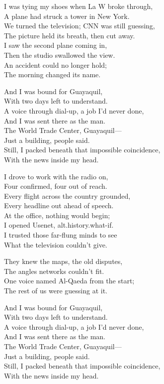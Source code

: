 \begin{lyrics}
I was tying my shoes when La W broke through,\\
A plane had struck a tower in New York.\\
We turned the television; CNN was still guessing,\\
The picture held its breath, then cut away.\\
I saw the second plane coming in,\\
Then the studio swallowed the view.\\
An accident could no longer hold;\\
The morning changed its name.

And I was bound for Guayaquil,\\
With two days left to understand.\\
A voice through dial-up, a job I’d never done,\\
And I was sent there as the man.\\
The World Trade Center, Guayaquil—\\
Just a building, people said.\\
Still, I packed beneath that impossible coincidence,\\
With the news inside my head.

I drove to work with the radio on,\\
Four confirmed, four out of reach.\\
Every flight across the country grounded,\\
Every headline out ahead of speech.\\
At the office, nothing would begin;\\
I opened Usenet, alt.history.what-if.\\
I trusted those far-flung minds to see\\
What the television couldn’t give.

They knew the maps, the old disputes,\\
The angles networks couldn’t fit.\\
One voice named Al-Qaeda from the start;\\
The rest of us were guessing at it.

And I was bound for Guayaquil,\\
With two days left to understand.\\
A voice through dial-up, a job I’d never done,\\
And I was sent there as the man.\\
The World Trade Center, Guayaquil—\\
Just a building, people said.\\
Still, I packed beneath that impossible coincidence,\\
With the news inside my head.


\end{lyrics}
